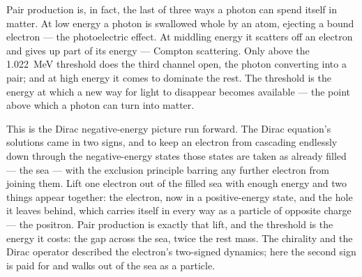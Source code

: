 Pair production is, in fact, the last of three ways a photon can spend itself in matter. At low energy a photon
is swallowed whole by an atom, ejecting a bound electron --- the photoelectric effect. At middling energy it
scatters off an electron and gives up part of its energy --- Compton scattering. Only above the 1.022~MeV
threshold does the third channel open, the photon converting into a pair; and at high energy it comes to
dominate the rest. The threshold is the energy at which a new way for light to disappear becomes available ---
the point above which a photon can turn into matter.

This is the Dirac negative-energy picture run forward. The Dirac equation's solutions came in two
signs, and to keep an electron from cascading endlessly down through the negative-energy states those states
are taken as already filled --- the sea --- with the exclusion principle barring any further electron from
joining them. Lift one electron out of the filled sea with enough energy and two things appear together: the
electron, now in a positive-energy state, and the hole it leaves behind, which carries itself in every way as a
particle of opposite charge --- the positron. Pair production is exactly that lift, and the threshold is the
energy it costs: the gap across the sea, twice the rest mass. The chirality and the Dirac operator described
the electron's two-signed dynamics; here the second sign is paid for and walks out
of the sea as a particle.


